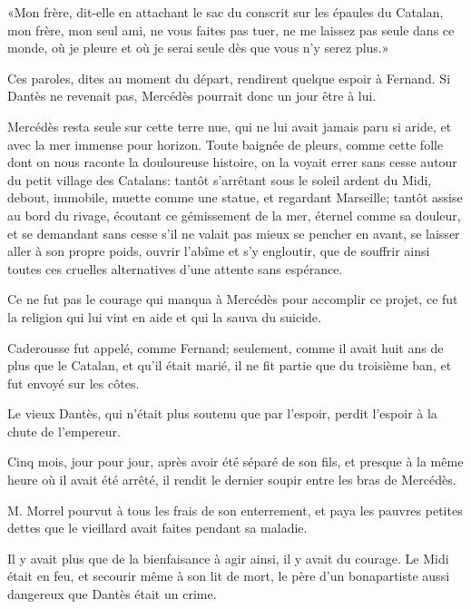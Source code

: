 «Mon frère, dit-elle en attachant le sac du conscrit sur les épaules du Catalan, mon frère, mon seul ami, ne vous faites pas tuer, ne me laissez pas seule dans ce monde, où je pleure et où je serai seule dès que vous n'y serez plus.»

Ces paroles, dites au moment du départ, rendirent quelque espoir à Fernand. Si Dantès ne revenait pas, Mercédès pourrait donc un jour être à lui.

Mercédès resta seule sur cette terre nue, qui ne lui avait jamais paru si aride, et avec la mer immense pour horizon. Toute baignée de pleurs, comme cette folle dont on nous raconte la douloureuse histoire, on la voyait errer sans cesse autour du petit village des Catalans: tantôt s'arrêtant sous le soleil ardent du Midi, debout, immobile, muette comme une statue, et regardant Marseille; tantôt assise au bord du rivage, écoutant ce gémissement de la mer, éternel comme sa douleur, et se demandant sans cesse s'il ne valait pas mieux se pencher en avant, se laisser aller à son propre poids, ouvrir l'abîme et s'y engloutir, que de souffrir ainsi toutes ces cruelles alternatives d'une attente sans espérance.

Ce ne fut pas le courage qui manqua à Mercédès pour accomplir ce projet, ce fut la religion qui lui vint en aide et qui la sauva du suicide.

Caderousse fut appelé, comme Fernand; seulement, comme il avait huit ans de plus que le Catalan, et qu'il était marié, il ne fit partie que du troisième ban, et fut envoyé sur les côtes.

Le vieux Dantès, qui n'était plus soutenu que par l'espoir, perdit l'espoir à la chute de l'empereur.

Cinq mois, jour pour jour, après avoir été séparé de son fils, et presque à la même heure où il avait été arrêté, il rendit le dernier soupir entre les bras de Mercédès.

M. Morrel pourvut à tous les frais de son enterrement, et paya les pauvres petites dettes que le vieillard avait faites pendant sa maladie.


Il y avait plus que de la bienfaisance à agir ainsi, il y avait du courage. Le Midi était en feu, et secourir même à son lit de mort, le père d'un bonapartiste aussi dangereux que Dantès était un crime.




